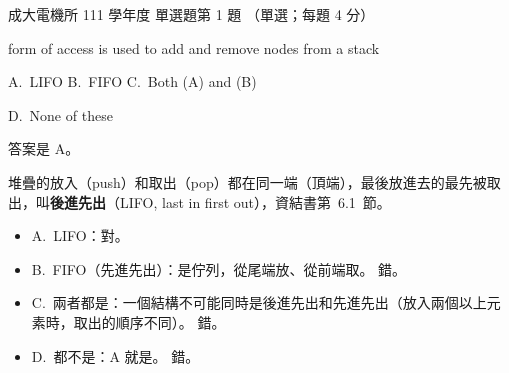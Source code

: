 \begin{pastexam}[label={px:ncku-111-ee-ds-01}]{成大電機所 111 學年度 單選題第 1 題}
（單選；每題 4 分）

\underline{\hspace{2em}} form of access is used to add and remove nodes from a stack

A.~LIFO \qquad B.~FIFO \qquad C.~Both (A) and (B)

D.~None of these
\end{pastexam}

\begin{pastsoln}
答案是 A。

堆疊的放入（push）和取出（pop）都在同一端（頂端），最後放進去的最先被取出，叫\textbf{後進先出}（LIFO, last in
first out），資結書第~6.1~節。
\begin{itemize}
\item A.~LIFO：對。
\item B.~FIFO（先進先出）：是佇列，從尾端放、從前端取。 錯。
\item C.~兩者都是：一個結構不可能同時是後進先出和先進先出（放入兩個以上元素時，取出的順序不同）。 錯。
\item D.~都不是：A 就是。 錯。
\end{itemize}
\end{pastsoln}
